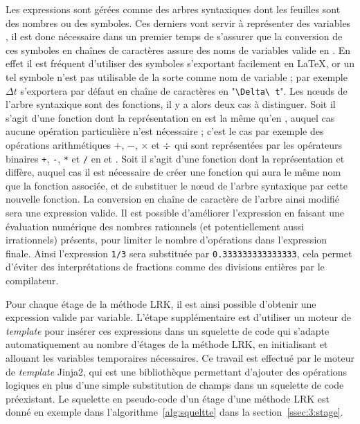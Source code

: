 Les expressions \sympy{} sont gérées comme des arbres syntaxiques dont les feuilles sont des nombres ou des symboles. Ces derniers vont servir à représenter des variables \CC, il est donc nécessaire dans un premier temps de s'assurer que la conversion de ces symboles en chaînes de caractères assure des noms de variables valide en \CC. En effet il est fréquent d'utiliser des symboles s'exportant facilement en \LaTeX{}, or un tel symbole n'est pas utilisable de la sorte comme nom de variable ; par exemple $\Delta t$ s'exportera par défaut en chaîne de caractères en "\texttt{\textbackslash Delta\textbackslash\ t}". Les nœuds de l'arbre syntaxique sont des fonctions, il y a alors deux cas à distinguer. Soit il s'agit d'une fonction dont la représentation en \Python{} est la même qu'en \CC, auquel cas aucune opération particulière n'est nécessaire ; c'est le cas par exemple des opérations arithmétiques $+$, $-$, $\times$ et $\divisionsymbol$ qui sont représentées par les opérateurs binaires \texttt{+}, \texttt{-}, \texttt{*} et \texttt{/} en \Python{} et \CC{}. Soit il s'agit d'une fonction dont la représentation \Python{} et \CC{} diffère, auquel cas il est nécessaire de créer une fonction \sympy{} qui aura le même nom que la fonction \CC{} associée, et de substituer le nœud de l'arbre syntaxique par cette nouvelle fonction. La conversion en chaîne de caractère de l'arbre ainsi modifié sera une expression \CC{} valide. Il est possible d'améliorer l'expression \CC{} en faisant une évaluation numérique des nombres rationnels (et potentiellement aussi irrationnels) présents, pour limiter le nombre d'opérations dans l'expression finale. Ainsi l'expression \texttt{1/3} sera substituée par \texttt{0.333333333333333}, cela permet d'éviter des interprétations de fractions comme des divisions entières par le compilateur.

Pour chaque étage de la méthode LRK, il est ainsi possible d'obtenir une expression \CC{} valide par variable. L'étape supplémentaire est d'utiliser un moteur de \emph{template} pour insérer ces expressions dans un squelette de code qui s'adapte automatiquement au nombre d'étages de la méthode LRK, en initialisant et allouant les variables temporaires nécessaires. Ce travail est effectué par le moteur de \emph{template} Jinja2, qui est une bibliothèque \Python{} permettant d'ajouter des opérations logiques en plus d'une simple substitution de champs dans un squelette de code préexistant. Le squelette en pseudo-code d'un étage d'une méthode LRK est donné en exemple dans l'algorithme~\ref{alg:squeltte} dans la section~\ref{ssec:3:stage}.

